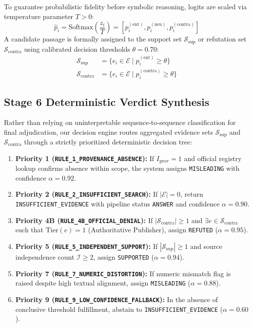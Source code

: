 To guarantee probabilistic fidelity before symbolic reasoning, logits are scaled via temperature parameter $T > 0$:
\begin{equation}
\hat{p}_i = \text{Softmax}\left(\frac{z_i}{T}\right) = \left[p_{i}^{(\text{ent})}, p_{i}^{(\text{neu})}, p_{i}^{(\text{contra})}\right]
\end{equation}
A candidate passage is formally assigned to the support set $\mathcal{S}_{\text{sup}}$ or refutation set $\mathcal{S}_{\text{contra}}$ using calibrated decision thresholds $\theta = 0.70$:
\begin{align}
\mathcal{S}_{\text{sup}} &= \{e_i \in \mathcal{E} \mid p_{i}^{(\text{ent})} \ge \theta\} \\
\mathcal{S}_{\text{contra}} &= \{e_i \in \mathcal{E} \mid p_{i}^{(\text{contra})} \ge \theta\}
\end{align}

\subsection{Stage 6 Deterministic Verdict Synthesis}
Rather than relying on uninterpretable sequence-to-sequence classification for final adjudication, our decision engine routes aggregated evidence sets $\mathcal{S}_{\text{sup}}$ and $\mathcal{S}_{\text{contra}}$ through a strictly prioritized deterministic decision tree:

\begin{enumerate}
    \item \textbf{Priority 1 (\texttt{RULE\_1\_PROVENANCE\_ABSENCE}):} If $I_{\text{prov}} = 1$ and official registry lookup confirms absence within scope, the system assigns \texttt{MISLEADING} with confidence $\alpha = 0.92$.
    \item \textbf{Priority 2 (\texttt{RULE\_2\_INSUFFICIENT\_SEARCH}):} If $|\mathcal{E}| = 0$, return \texttt{INSUFFICIENT\_EVIDENCE} with pipeline status \texttt{ANSWER} and confidence $\alpha = 0.90$.
    \item \textbf{Priority 4B (\texttt{RULE\_4B\_OFFICIAL\_DENIAL}):} If $|\mathcal{S}_{\text{contra}}| \ge 1$ and $\exists e \in \mathcal{S}_{\text{contra}}$ such that $\text{Tier}(e) = 1$ (Authoritative Publisher), assign \texttt{REFUTED} ($\alpha = 0.95$).
    \item \textbf{Priority 5 (\texttt{RULE\_5\_INDEPENDENT\_SUPPORT}):} If $|\mathcal{S}_{\text{sup}}| \ge 1$ and source independence count $\mathcal{I} \ge 2$, assign \texttt{SUPPORTED} ($\alpha = 0.94$).
    \item \textbf{Priority 7 (\texttt{RULE\_7\_NUMERIC\_DISTORTION}):} If numeric mismatch flag is raised despite high textual alignment, assign \texttt{MISLEADING} ($\alpha = 0.88$).
    \item \textbf{Priority 9 (\texttt{RULE\_9\_LOW\_CONFIDENCE\_FALLBACK}):} In the absence of conclusive threshold fulfillment, abstain to \texttt{INSUFFICIENT\_EVIDENCE} ($\alpha = 0.60$).
\end{enumerate}
